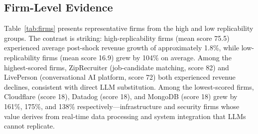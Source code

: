 \documentclass[12pt,a4paper]{article}
\begin{document}


\subsection{Firm-Level Evidence}

Table~\ref{tab:firms} presents representative firms from the high and low replicability groups. The contrast is striking: high-replicability firms (mean score 75.5) experienced average post-shock revenue growth of approximately 1.8\%, while low-replicability firms (mean score 16.9) grew by 104\% on average. Among the highest-scored firms, ZipRecruiter (job-candidate matching, score 82) and LivePerson (conversational AI platform, score 72) both experienced revenue declines, consistent with direct LLM substitution. Among the lowest-scored firms, Cloudflare (score 18), Datadog (score 18), and MongoDB (score 18) grew by 161\%, 175\%, and 138\% respectively---infrastructure and security firms whose value derives from real-time data processing and system integration that LLMs cannot replicate.
\end{document}
